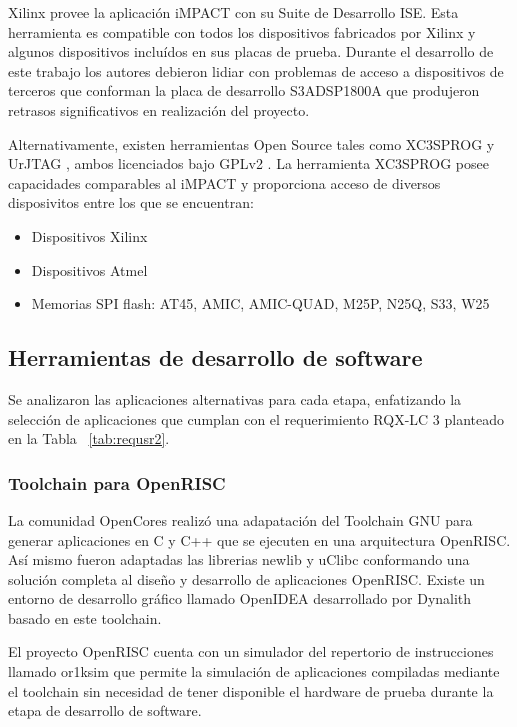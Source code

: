 				Xilinx provee la aplicación iMPACT con su Suite de Desarrollo ISE. Esta herramienta es compatible con todos los dispositivos fabricados por
				Xilinx y algunos dispositivos incluídos en sus placas de prueba. Durante el desarrollo de este trabajo los autores debieron lidiar con
				problemas de acceso a dispositivos de terceros que conforman la placa de desarrollo S3ADSP1800A que produjeron retrasos significativos en
				realización del proyecto.
 				
 				Alternativamente, existen herramientas Open Source tales como XC3SPROG y UrJTAG , ambos licenciados bajo GPLv2 . La herramienta XC3SPROG
 				posee capacidades comparables al iMPACT y proporciona acceso de diversos disposivitos entre los que se encuentran:
 				\begin{itemize}
 				  \item Dispositivos Xilinx
				  \item Dispositivos Atmel 
				  \item Memorias SPI flash: AT45, AMIC, AMIC-QUAD, M25P, N25Q, S33, W25
 				\end{itemize}
 				 
 				\subsection {Herramientas de desarrollo de software}
 			
				Se analizaron las aplicaciones alternativas para cada etapa, enfatizando la selección de aplicaciones que cumplan con el requerimiento RQX-LC 3
				planteado en la Tabla ~\ref{tab:requsr2}.   
				 			
 				\subsubsection {Toolchain para OpenRISC}
 				La comunidad OpenCores realizó una adapatación del Toolchain GNU para generar aplicaciones en C y C++ que se ejecuten en una arquitectura
 				OpenRISC. Así mismo fueron adaptadas las librerias newlib y uClibc conformando una solución completa al diseño y desarrollo de aplicaciones
 				OpenRISC. Existe un entorno de desarrollo gráfico llamado OpenIDEA desarrollado por Dynalith basado en este toolchain. 
				
				El proyecto OpenRISC cuenta con un simulador del repertorio de instrucciones llamado or1ksim que permite la simulación de aplicaciones compiladas
				mediante el toolchain sin necesidad de tener disponible el hardware de prueba durante la etapa de desarrollo de software.
 				

